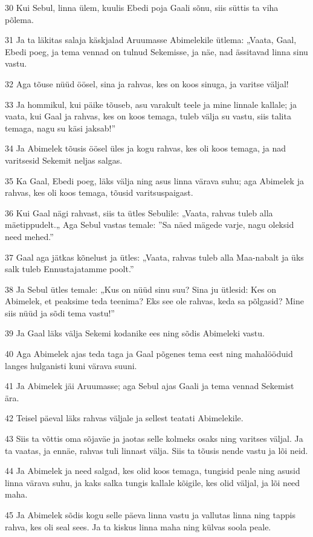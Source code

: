 \par 30 Kui Sebul, linna ülem, kuulis Ebedi poja Gaali sõnu, siis süttis ta viha põlema.
\par 31 Ja ta läkitas salaja käskjalad Aruumasse Abimelekile ütlema: „Vaata, Gaal, Ebedi poeg, ja tema vennad on tulnud Sekemisse, ja näe, nad ässitavad linna sinu vastu.
\par 32 Aga tõuse nüüd öösel, sina ja rahvas, kes on koos sinuga, ja varitse väljal!
\par 33 Ja hommikul, kui päike tõuseb, asu varakult teele ja mine linnale kallale; ja vaata, kui Gaal ja rahvas, kes on koos temaga, tuleb välja su vastu, siis talita temaga, nagu su käsi jaksab!”
\par 34 Ja Abimelek tõusis öösel üles ja kogu rahvas, kes oli koos temaga, ja nad varitsesid Sekemit neljas salgas.
\par 35 Ka Gaal, Ebedi poeg, läks välja ning asus linna värava suhu; aga Abimelek ja rahvas, kes oli koos temaga, tõusid varitsuspaigast.
\par 36 Kui Gaal nägi rahvast, siis ta ütles Sebulile: „Vaata, rahvas tuleb alla mäetippudelt.„ Aga Sebul vastas temale: ”Sa näed mägede varje, nagu oleksid need mehed.”
\par 37 Gaal aga jätkas kõnelust ja ütles: „Vaata, rahvas tuleb alla Maa-nabalt ja üks salk tuleb Ennustajatamme poolt.”
\par 38 Ja Sebul ütles temale: „Kus on nüüd sinu suu? Sina ju ütlesid: Kes on Abimelek, et peaksime teda teenima? Eks see ole rahvas, keda sa põlgasid? Mine siis nüüd ja sõdi tema vastu!”
\par 39 Ja Gaal läks välja Sekemi kodanike ees ning sõdis Abimeleki vastu.
\par 40 Aga Abimelek ajas teda taga ja Gaal põgenes tema eest ning mahalööduid langes hulganisti kuni värava suuni.
\par 41 Ja Abimelek jäi Aruumasse; aga Sebul ajas Gaali ja tema vennad Sekemist ära.
\par 42 Teisel päeval läks rahvas väljale ja sellest teatati Abimelekile.
\par 43 Siis ta võttis oma sõjaväe ja jaotas selle kolmeks osaks ning varitses väljal. Ja ta vaatas, ja ennäe, rahvas tuli linnast välja. Siis ta tõusis nende vastu ja lõi neid.
\par 44 Ja Abimelek ja need salgad, kes olid koos temaga, tungisid peale ning asusid linna värava suhu, ja kaks salka tungis kallale kõigile, kes olid väljal, ja lõi need maha.
\par 45 Ja Abimelek sõdis kogu selle päeva linna vastu ja vallutas linna ning tappis rahva, kes oli seal sees. Ja ta kiskus linna maha ning külvas soola peale.
